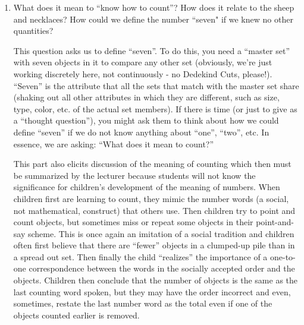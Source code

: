 \documentclass{ximera}
\begin{document}
\begin{enumerate}
\vskip 1.5in

\item 	What does it mean to ``know how to count''?  How does it relate to the sheep and necklaces?  How could we define the number ``seven" if we knew no other quantities?
\begin{instructorNotes}
This question asks us to define ``seven''. To do this, you need a ``master set'' with seven objects in it to compare any other set (obviously, we're just working discretely here, not continuously - no Dedekind Cuts, please!).  ``Seven'' is the attribute that all the sets that match with the master set share (shaking out all other attributes in which they are different, such as size, type, color, etc. of the actual set members).  If there is time (or just to give as a ``thought question''), you might ask them to think about how we could define ``seven'' if we do not know anything about ``one'', ``two'', etc.  In essence, we are asking: ``What does it mean to count?''

This part also elicits discussion of the meaning of counting which then must be summarized by the lecturer because students will not know the significance for children's development of the meaning of numbers.  When children first are learning to count, they mimic the number words (a social, not mathematical, construct) that others use.  Then children try to point and count objects, but sometimes miss or repeat some objects in their point-and-say scheme.  This is once again an imitation of a social tradition and children often first believe that there are ``fewer'' objects in a clumped-up pile than in a spread out set.  Then finally the child ``realizes'' the importance of a one-to-one correspondence between the words in the socially accepted order and the objects.  Children then conclude that the number of objects is the same as the last counting word spoken, but they may have the order incorrect and even, sometimes, restate the last number word as the total even if one of the objects counted earlier is removed.
\end{instructorNotes}
\end{enumerate}
\end{document}
